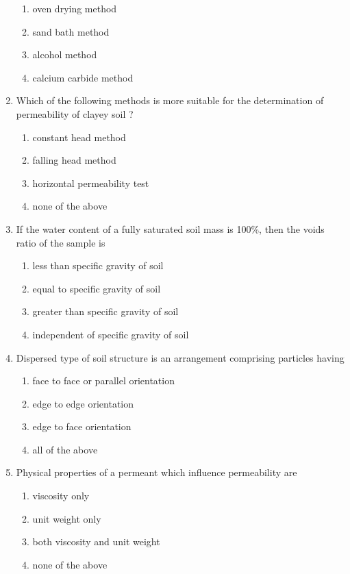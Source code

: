 \documentclass[11pt,a4paper]{article}
\begin{document}
\begin{enumerate}
\begin{enumerate}[label=\Alph*.]
\item{oven drying method}
\item{sand bath method}
\item{alcohol method}
\item{calcium carbide method}
\end{enumerate}
\item{Which of the following methods is more suitable for the determination of permeability of clayey soil ?}
\begin{enumerate}[label=\Alph*.]
\item{constant head method}
\item{falling head method}
\item{horizontal permeability test}
\item{none of the above}
\end{enumerate}
\item{If the water content of a fully saturated soil mass is 100\%, then the voids ratio of the sample is}
\begin{enumerate}[label=\Alph*.]
\item{less than specific gravity of soil}
\item{equal to specific gravity of soil}
\item{greater than specific gravity of soil}
\item{independent of specific gravity of soil}
\end{enumerate}
\item{Dispersed type of soil structure is an arrangement comprising particles having}
\begin{enumerate}[label=\Alph*.]
\item{face to face or parallel orientation}
\item{edge to edge orientation}
\item{edge to face orientation}
\item{all of the above}
\end{enumerate}
\item{Physical properties of a permeant which influence permeability are}
\begin{enumerate}[label=\Alph*.]
\item{viscosity only}
\item{unit weight only}
\item{both viscosity and unit weight}
\item{none of the above}
\end{enumerate}

\end{enumerate}
\end{document}
